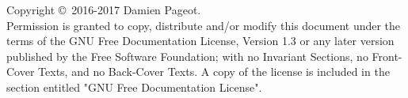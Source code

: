 \null\vfill
\thispagestyle{empty}

\noindent Copyright \copyright\ 2016-2017 Damien Pageot.\\

\noindent Permission is granted to copy, distribute and/or modify this document under the terms of the GNU Free Documentation License, Version 1.3 or any later version published by the Free Software Foundation; with no Invariant Sections, no Front-Cover Texts, and no Back-Cover Texts. A copy of the license is included in the section entitled "GNU Free Documentation License".

\clearpage\newpage
